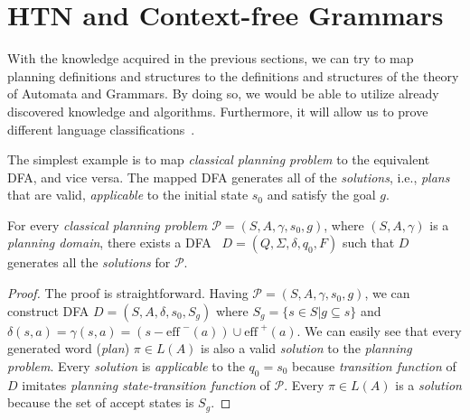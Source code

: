\begin{example}\label{ex02:6}
\end{example}

\section{HTN and Context-free Grammars}

\medskip\noindent
With the knowledge acquired in the previous sections, we can try to map planning definitions and structures to the definitions and structures of the theory of Automata and Grammars. By doing so, we would be able to utilize already discovered knowledge and algorithms. Furthermore, it will allow us to prove different language classifications~\cite{langclassification}.

\medskip\noindent
The simplest example is to map \emph{classical planning problem} to the equivalent DFA, and vice versa. The mapped DFA generates all of the \emph{solutions}, i.e., \emph{plans} that are valid, \emph{applicable} to the initial state $s_0$ and satisfy the goal $g$.

\begin{thm}\label{thm02:1}
    For every \emph{classical planning problem $\mathcal{P} = (S, A, \gamma, s_0, g)$}, where $(S, A, \gamma)$ is a \emph{planning domain}, there exists a DFA~\cite{chytil} $D = (Q, \Sigma, \delta, q_0, F)$ such that $D$ generates all the \emph{solutions} for $\mathcal{P}$.
\end{thm}
\begin{proof}
    The proof is straightforward. Having $\mathcal{P} = (S, A, \gamma, s_0, g)$, we can construct DFA $D = (S,A,\delta,s_0,S_g)$ where $S_g=\{s \in S | g \subseteq s\}$ and $\delta(s,a) = \gamma(s, a) = (s-\text{eff}^{\,\,-}(a)) \cup \text{eff}^{\,\,+}(a)$. We can easily see that every generated word (\emph{plan}) $\pi \in L(A)$ is also a valid \emph{solution} to the \emph{planning problem}. Every \emph{solution} is \emph{applicable} to the $q_0 = s_0$ because \emph{transition function} of $D$ imitates \emph{planning state-transition function} of $\mathcal{P}$. Every $\pi \in L(A)$ is a \emph{solution} because the set of accept states is $S_g$.
\end{proof}


